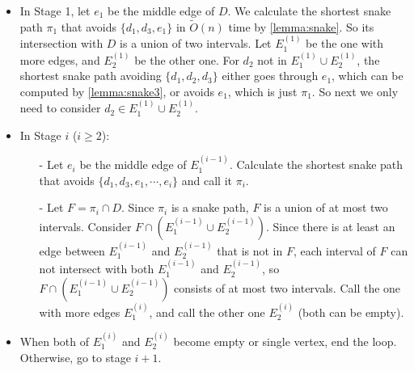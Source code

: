 \documentclass[11pt]{article}
\theoremstyle{plain}
\theoremstyle{definition}
\newcommand{\too}[1]{\tilde{O}({#1})}
\begin{document}
\begin{itemize}

    \item In Stage 1, let $e_1$ be the middle edge of $D$. We calculate the shortest snake path $\pi_1$ that avoids $\{d_1,d_3,e_1\}$ in $\too{n}$ time by \cref{lemma:snake}. So its intersection with $D$ is a union of two intervals. Let $E_1^{(1)}$ be the one with more edges, and $E_2^{(1)}$ be the other one. For $d_2$ not in $E_1^{(1)}\cup E_2^{(1)}$, the shortest snake path avoiding $\{d_1,d_2,d_3\}$ either goes through $e_1$, which can be computed by \cref{lemma:snake3}, or avoids $e_1$, which is just $\pi_1$. So next we only need to consider $d_2\in E_1^{(1)}\cup E_2^{(1)}$.

    \item In Stage $i$ ($i\geq 2$):
    \begin{itemize}
 
  
        \item[-] Let $e_i$ be the middle edge of $E_1^{(i-1)}$. Calculate the shortest snake path that avoids $\{d_1,d_3,e_1,\cdots,e_i\}$ and call it $\pi_i$.
    
        \item[-] Let $F=\pi_i \cap D$. Since $\pi_i$ is a snake path, $F$ is a union of at most two intervals. Consider $F \cap \left(E_1^{(i-1)}\cup E_2^{(i-1)}\right)$. Since there is at least an edge between $E_1^{(i-1)}$ and $E_2^{(i-1)}$ that is not in $F$, each interval of $F$ can not intersect with both $E_1^{(i-1)}$ and $E_2^{(i-1)}$, so $F \cap \left(E_1^{(i-1)}\cup E_2^{(i-1)}\right)$ consists of at most two intervals. Call the one with more edges $E_1^{(i)}$, and call the other one $E_2^{(i)}$ (both can be empty).
      \end{itemize}
    \item When both of $E_1^{(i)}$ and $E_2^{(i)}$ become empty or single vertex, end the loop. Otherwise, go to stage $i+1$.
        




\begin{center}
    


\begin{tikzpicture}[x=0.75pt,y=0.75pt,yscale=-1,xscale=1]



\end{tikzpicture}
\end{center}
\end{itemize}
\end{document}

